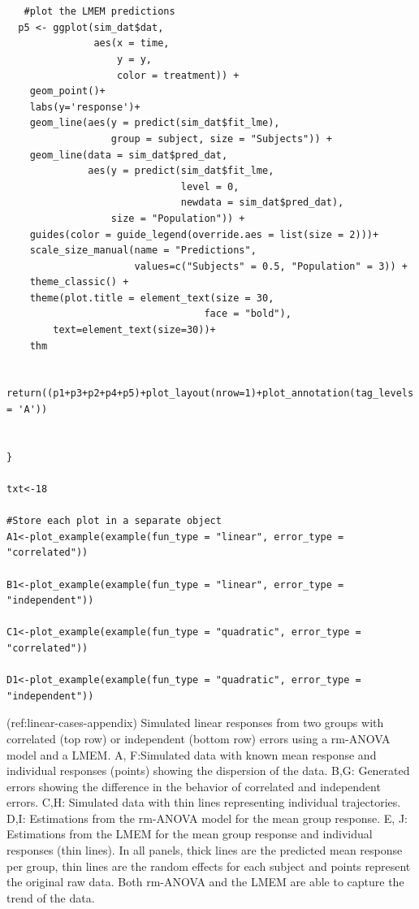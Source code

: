 \documentclass[Royal,times,sagev]{sagej}
\begin{document}
\begin{verbatim}
   
   
   #plot the LMEM predictions
  p5 <- ggplot(sim_dat$dat, 
               aes(x = time, 
                   y = y, 
                   color = treatment)) +
    geom_point()+
    labs(y='response')+
    geom_line(aes(y = predict(sim_dat$fit_lme), 
                  group = subject, size = "Subjects")) +
    geom_line(data = sim_dat$pred_dat, 
              aes(y = predict(sim_dat$fit_lme, 
                              level = 0, 
                              newdata = sim_dat$pred_dat), 
                  size = "Population")) +
    guides(color = guide_legend(override.aes = list(size = 2)))+
    scale_size_manual(name = "Predictions", 
                      values=c("Subjects" = 0.5, "Population" = 3)) +
    theme_classic() +
    theme(plot.title = element_text(size = 30, 
                                  face = "bold"),
        text=element_text(size=30))+
    thm
  
  return((p1+p3+p2+p4+p5)+plot_layout(nrow=1)+plot_annotation(tag_levels = 'A')) 
  
    
}

txt<-18

#Store each plot in a separate object
A1<-plot_example(example(fun_type = "linear", error_type = "correlated")) 

B1<-plot_example(example(fun_type = "linear", error_type = "independent")) 
  
C1<-plot_example(example(fun_type = "quadratic", error_type = "correlated")) 
  
D1<-plot_example(example(fun_type = "quadratic", error_type = "independent")) 
\end{verbatim}

(ref:linear-cases-appendix) Simulated linear responses from two groups
with correlated (top row) or independent (bottom row) errors using a
rm-ANOVA model and a LMEM. A, F:Simulated data with known mean response
and individual responses (points) showing the dispersion of the data.
B,G: Generated errors showing the difference in the behavior of
correlated and independent errors. C,H: Simulated data with thin lines
representing individual trajectories. D,I: Estimations from the rm-ANOVA
model for the mean group response. E, J: Estimations from the LMEM for
the mean group response and individual responses (thin lines). In all
panels, thick lines are the predicted mean response per group, thin
lines are the random effects for each subject and points represent the
original raw data. Both rm-ANOVA and the LMEM are able to capture the
trend of the data.
\end{document}
